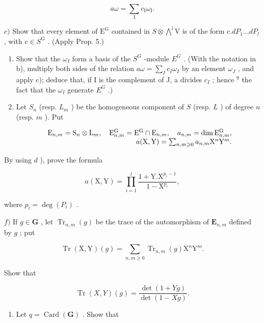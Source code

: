 \[
a \omega = \sum_ {\mathrm{I}} c _ {\mathrm{I}} \omega_ {\mathrm{I}}.
\]

\(c)\) Show that every element of \(\mathrm{E}^{\mathrm{G}}\) contained in \(S\otimes \bigwedge^{l}\mathrm{V}\) is of the form \(c.dP_{1}\ldots dP_{l}\) , with \(c\in S^{\mathrm{G}}\) . (Apply Prop. 5.)

\begin{enumerate}
\def\labelenumi{\alph{enumi})}
\setcounter{enumi}{3}
\item
  Show that the \(\omega_{I}\) form a basis of the \(S^{G}\) -module \(E^{G}\) . (With the notation in b), multiply both sides of the relation \(a\omega = \sum_{I} c_{I}\omega_{I}\) by an element \(\omega_{J}\) , and apply c); deduce that, if I is the complement of J, a divides \(c_{I}\) ; hence \(^{9}\) the fact that the \(\omega_{I}\) generate \(E^{G}\) .)
\item
  Let \(S_{n}\) (resp. \(L_{m}\) ) be the homogeneous component of \(S\) (resp. \(L\) ) of degree \(n\) (resp. \(m\) ). Put
\end{enumerate}

\[
\begin{array}{r l r} & & {\mathrm{E} _ {n, m} = \mathrm{S} _ {n} \otimes \mathrm{L} _ {m}, \quad \mathrm{E} _ {n, m} ^ {\mathrm{G}} = \mathrm{E} ^ {\mathrm{G}} \cap \mathrm{E} _ {n, m}, \quad a _ {n, m} = \dim \mathrm{E} _ {n, m} ^ {\mathrm{G}},} \\ & & {a (\mathrm{X}, \mathrm{Y}) = \sum_ {n, m \geqslant 0} a _ {n, m} \mathrm{X} ^ {n} \mathrm{Y} ^ {m}.} \end{array}
\]

By using \(d\) ), prove the formula

\[
a (\mathrm{X}, \mathrm{Y}) = \prod_ {i = 1} ^ {l} \frac {1 + \mathrm{Y} . \mathrm{X} ^ {p _ {i} - 1}}{1 - \mathrm{X} ^ {p _ {i}}},
\]

where \(p_{i} = \deg(P_{i})\) .

\(f)\) If \(g \in \mathbf{G}\) , let \(\operatorname{Tr}_{n,m}(g)\) be the trace of the automorphism of \(\mathbf{E}_{n,m}\) defined by \(g\) ; put

\[
\operatorname{Tr} (\mathrm{X}, \mathrm{Y}) (g) = \sum_ {n, m \geqslant 0} \operatorname{Tr} _ {n, m} (g) \mathrm{X} ^ {n} \mathrm{Y} ^ {m}.
\]

Show that

\[
\operatorname{Tr} (X, Y) (g) = \frac {\det (1 + Y g)}{\det (1 - X g)}.
\]

\begin{enumerate}
\def\labelenumi{\alph{enumi})}
\setcounter{enumi}{6}
\tightlist
\item
  Let \(q = \operatorname{Card}(\mathbf{G})\) . Show that
\end{enumerate}

